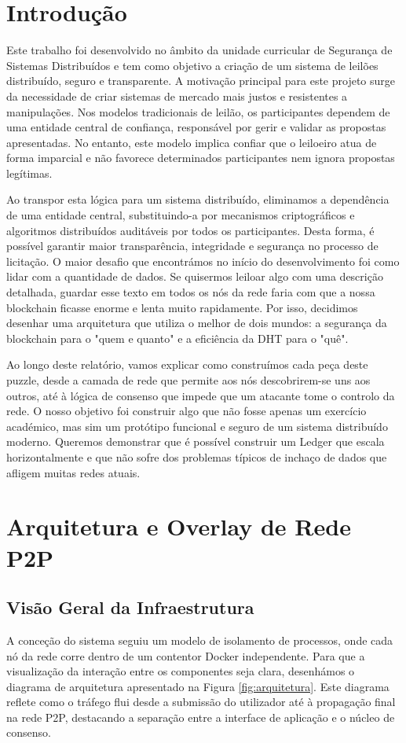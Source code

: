 \documentclass[11pt]{article}
\begin{document}
\newpage

\section{Introdução}

Este trabalho foi desenvolvido no âmbito da unidade curricular de Segurança de Sistemas Distribuídos e tem como objetivo a criação de um sistema de leilões distribuído, seguro e transparente. A motivação principal para este projeto surge da necessidade de criar sistemas de mercado mais justos e resistentes a manipulações. Nos modelos tradicionais de leilão, os participantes dependem de uma entidade central de confiança, responsável por gerir e validar as propostas apresentadas. No entanto, este modelo implica confiar que o leiloeiro atua de forma imparcial e não favorece determinados participantes nem ignora propostas legítimas.

Ao transpor esta lógica para um sistema distribuído, eliminamos a dependência de uma entidade central, substituindo-a por mecanismos criptográficos e algoritmos distribuídos auditáveis por todos os participantes. Desta forma, é possível garantir maior transparência, integridade e segurança no processo de licitação. O maior desafio que encontrámos no início do desenvolvimento foi como lidar com a quantidade de dados. Se quisermos leiloar algo com uma descrição detalhada, guardar esse texto em todos os nós da rede faria com que a nossa blockchain ficasse enorme e lenta muito rapidamente. Por isso, decidimos desenhar uma arquitetura que utiliza o melhor de dois mundos: a segurança da blockchain para o "quem e quanto" e a eficiência da DHT para o "quê".

Ao longo deste relatório, vamos explicar como construímos cada peça deste puzzle, desde a camada de rede que permite aos nós descobrirem-se uns aos outros, até à lógica de consenso que impede que um atacante tome o controlo da rede. O nosso objetivo foi construir algo que não fosse apenas um exercício académico, mas sim um protótipo funcional e seguro de um sistema distribuído moderno. Queremos demonstrar que é possível construir um Ledger que escala horizontalmente e que não sofre dos problemas típicos de inchaço de dados que afligem muitas redes atuais.

\section{Arquitetura e Overlay de Rede P2P}

\subsection{Visão Geral da Infraestrutura}
A conceção do sistema seguiu um modelo de isolamento de processos, onde cada nó da rede corre dentro de um contentor Docker independente. Para que a visualização da interação entre os componentes seja clara, desenhámos o diagrama de arquitetura apresentado na Figura \ref{fig:arquitetura}. Este diagrama reflete como o tráfego flui desde a submissão do utilizador até à propagação final na rede P2P, destacando a separação entre a interface de aplicação e o núcleo de consenso.
\end{document}
